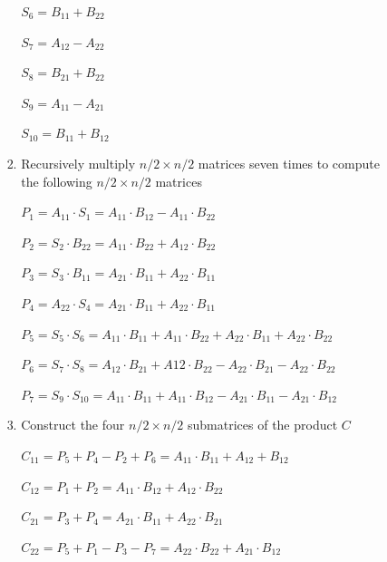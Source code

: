 \documentclass[12pt]{article}
\begin{document}
\begin{enumerate}[1.]
\begin{itemize}
\begin{itemize}
\begin{enumerate}[1)]
                $S_6 = B_{11} + B_{22}$

                $S_7 = A_{12} - A_{22}$

                $S_8 = B_{21} + B_{22}$

                $S_9 = A_{11} - A_{21}$

                $S_{10} = B_{11} + B_{12}$

                \bigskip

                \item Recursively multiply $n/2 \times n/2$ matrices seven times to
                compute the following $n/2 \times n/2$ matrices

                \bigskip

                $P_1 = A_{11} \cdot S_1 = A_{11} \cdot B_{12} - A_{11} \cdot B_{22}$

                $P_2 = S_2 \cdot B_{22} = A_{11} \cdot B_{22} + A_{12} \cdot B_{22}$

                $P_3 = S_3 \cdot B_{11} = A_{21} \cdot B_{11} + A_{22} \cdot B_{11}$

                $P_4 = A_{22} \cdot S_4 = A_{21} \cdot B_{11} + A_{22} \cdot B_{11}$

                $P_5 = S_5 \cdot S_6 = A_{11} \cdot B_{11} + A_{11} \cdot B_{22} + A_{22} \cdot B_{11} + A_{22} \cdot B_{22}$

                $P_6 = S_7 \cdot S_8 = A_{12} \cdot B_{21} + A{12} \cdot B_{22} - A_{22} \cdot B_{21} - A_{22} \cdot B_{22}$

                $P_7 = S_9 \cdot S_{10} = A_{11} \cdot B_{11} + A_{11} \cdot B_{12} - A_{21} \cdot B_{11} - A_{21} \cdot B_{12}$

                \item Construct the four $n/2 \times n/2$ submatrices of the product $C$

                \bigskip

                $C_{11} = P_5 + P_4 - P_2 + P_6 = A_{11} \cdot B_{11} + A_{12} + B_{12}$

                $C_{12} = P_1 + P_2 = A_{11} \cdot B_{12} + A_{12} \cdot B_{22}$

                $C_{21} = P_3 + P_4 = A_21\cdot B_11 + A_{22} \cdot B_{21}$

                $C_{22} = P_5 + P_1 - P_3 - P_7 = A_{22} \cdot B_{22} + A_{21} \cdot B_{12}$

            \end{enumerate}


\end{itemize}
\end{itemize}
\end{enumerate}
\end{document}
